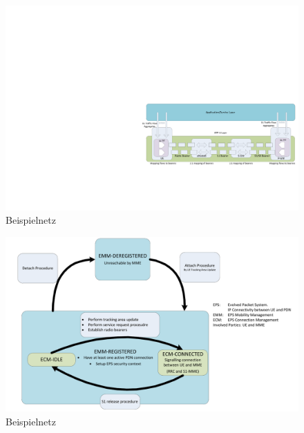 \begin{figure}[htbp]
 \centering
 \includegraphics[width=1.0\textwidth]{images/3gpp/bearers.pdf}
 \caption{Beispielnetz}\label{fig:3gpp-bearers}
\end{figure}


\begin{figure}[htbp]
 \centering
 \includegraphics[width=1.0\textwidth]{images/3gpp/ECM-states.pdf}
 \caption{Beispielnetz}\label{fig:3gpp-ecmstates}
\end{figure}

